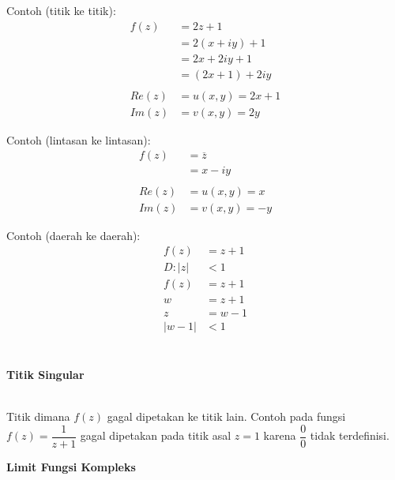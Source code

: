 \documentclass{article}
\begin{document}
Contoh (titik ke titik):
\begin{align}
    f(z)  & = 2z + 1
    \nonumber                 \\
          & = 2(x+iy) + 1
    \nonumber                 \\
          & = 2x + 2iy + 1
    \nonumber                 \\
          & = (2x + 1) + 2iy
    \\\nonumber\\
    Re(z) & = u(x,y) = 2x + 1
    \nonumber                 \\
    Im(z) & = v(x,y) = 2y
    \nonumber
\end{align}

Contoh (lintasan ke lintasan):
\begin{align}
    f(z)  & = \overline{z}
    \nonumber              \\
          & = x - iy
    \\\nonumber\\
    Re(z) & = u(x,y) = x
    \nonumber              \\
    Im(z) & = v(x,y) = -y
    \nonumber
\end{align}

Contoh (daerah ke daerah):
\begin{align}
    f(z)    & = z + 1
    \nonumber         \\
    D : |z| & <1
    \nonumber         \\
    f(z)    & = z + 1
    \nonumber         \\
    w       & = z + 1
    \nonumber         \\
    z       & = w - 1
    \nonumber         \\
    |w-1|   & < 1
    \\\nonumber
\end{align}
\\

\begin{center}
    \textbf{Titik Singular}
\end{center}
\leavevmode\\

Titik dimana $f(z)$ gagal dipetakan ke titik lain. Contoh pada fungsi \\ $f(z) = \dfrac{1}{z+1}$ gagal dipetakan pada titik asal $z=1$ karena $\dfrac{0}{0}$ tidak terdefinisi.

\newpage
\begin{center}
    \textbf{Limit Fungsi Kompleks}
\end{center}
\leavevmode\\
\end{document}
